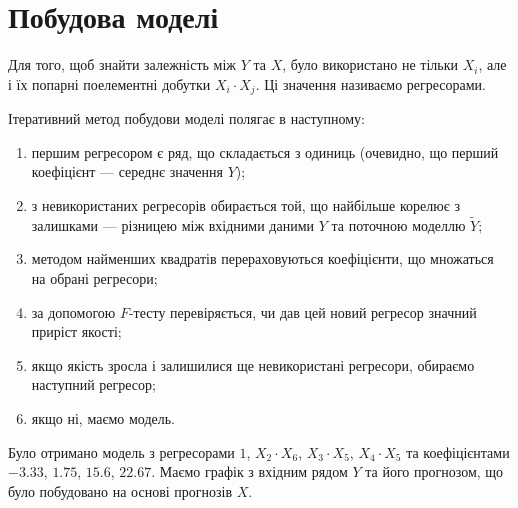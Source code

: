 \section{Побудова моделі}

Для того, щоб знайти залежність між $Y$ та $X$,
було використано не тільки $X_i$,
але і їх попарні поелементні добутки $X_i \cdot X_j$.
Ці значення називаємо регресорами.

Ітеративний метод побудови моделі полягає в наступному:
\begin{enumerate}
  \item першим регресором є ряд, що складається з одиниць
    (очевидно, що перший коефіцієнт --- середнє значення $Y$);
  \item з невикористаних регресорів обирається той,
    що найбільше корелює з залишками ---
    різницею між вхідними даними $Y$ та поточною моделлю $\tilde{Y}$;
  \item методом найменших квадратів перераховуються коефіцієнти,
    що множаться на обрані регресори;
  \item за допомогою $F$-тесту перевіряється,
    чи дав цей новий регресор значний приріст якості;
  \item якщо якість зросла і залишилися ще невикористані регресори,
    обираємо наступний регресор;
  \item якщо ні, маємо модель.
\end{enumerate}

Було отримано модель з регресорами $\mathcal{1}$,
$X_2 \cdot X_6$, $X_3 \cdot X_5$, $X_4 \cdot X_5$
та коефіцієнтами $-3.33$, $1.75$, $15.6$, $22.67$.
Маємо графік з вхідним рядом $Y$
та його прогнозом, що було побудовано на основі прогнозів $X$.

\begin{center}
\end{center}
